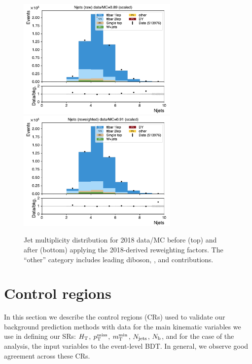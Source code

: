 \begin{figure}[h!]
\centering
\includegraphics[width=0.70\textwidth]{figs/ftan/isr/njets_raw.pdf} \\
\includegraphics[width=0.70\textwidth]{figs/ftan/isr/njets_corr.pdf}
\caption{
    Jet multiplicity distribution for 2018 data/MC before (top) and after (bottom)
    applying the 2018-derived reweighting factors. The ``other'' category includes
    leading diboson, \ttW, and \ttZ contributions.
}
\label{fig:isrweightsyst}
\end{figure}


\FloatBarrier

\section{Control regions}

In this section we describe the control regions (CRs) used to validate our background
prediction methods with data for the main kinematic variables
we use in defining our SRs: $H_{\mathrm{T}}$, $p_{\mathrm{T}}^\text{miss}$, $m_{\mathrm{T}}^{\text{min}}$,
$N_\text{jets}$, $N_\mathrm{b}$, and for the case of the \smft analysis, the input variables
to the event-level BDT. In general, we observe good agreement across these CRs.


